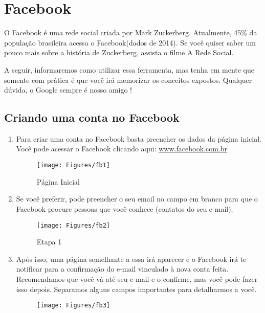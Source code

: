 \documentclass[hidelinks,12pt]{article}
\begin{document}
	\section{Facebook}
	
	O Facebook é uma rede social criada por Mark Zuckerberg. Atualmente, 45\% da população brasileira acessa o Facebook(dados de 2014). Se você quiser saber um pouco mais sobre a história de Zuckerberg, assista o filme A Rede Social.
	
	A seguir, informaremos como utilizar essa ferramenta, mas tenha em mente que somente com prática é que você irá memorizar os conceitos expostos. Qualquer dúvida, o Google sempre é nosso amigo !

	\subsection{Criando uma conta no Facebook}
		\begin{enumerate}
			\item Para criar uma conta no Facebook basta preencher os dados da página inicial. Você pode acessar o Facebook clicando aqui: \url{www.facebook.com.br}

			\begin{figure}[!h]
				\centering
				\texttt{[image: Figures/fb1]}
				\label{fig:paginafb}
				\caption{Página Inicial}
			\end{figure}

			\item Se você preferir, pode preencher o seu email no campo em branco para que o Facebook procure pessoas que você conhece (contatos do seu e-mail);

			\begin{figure}[!h]
				\centering
				\texttt{[image: Figures/fb2]}
				\label{fig:paginaf2}
				\caption{Etapa 1}
			\end{figure}

			\item Após isso, uma página semelhante a essa irá aparecer e o Facebook irá te notificar para a confirmação do e-mail vinculado à nova conta feita. Recomendamos que você vá até seu e-mail e o confirme, mas você pode fazer isso depois.
			Separamos alguns campos importantes para detalharmos a você.

			\begin{figure}[!h]
				\centering
				\texttt{[image: Figures/fb3]}
				\label{fig:paginaf3}
			\end{figure}

		\end{enumerate}
\end{document}
